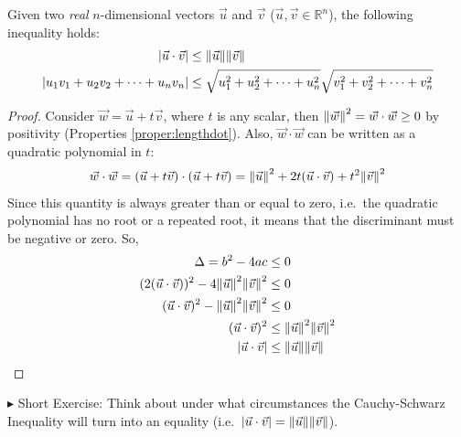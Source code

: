\begin{thm}
\label{thm:CauchySch}
Given two \textit{real} $n$-dimensional vectors $\vec{u}$ and $\vec{v}$ ($\vec{u}, \vec{v} \in \mathbb{R}^n$), the following inequality holds:
\begin{subequations}
\begin{align}
|\vec{u} \cdot \vec{v}| &\leq \norm{\vec{u}}\norm{\vec{v}} \\
|u_1v_1+u_2v_2+\cdots+u_nv_n| &\leq \sqrt{u_1^2+u_2^2+\cdots+u_n^2}\sqrt{v_1^2+v_2^2+\cdots+v_n^2}
\end{align}    
\end{subequations}
\end{thm}
\begin{proof}
Consider $\vec{w} = \vec{u} + t\vec{v}$, where $t$ is any scalar, then $\norm{\vec{w}}^2 = \vec{w}\cdot\vec{w} \geq 0$ by positivity (Properties \ref{proper:lengthdot}). Also, $\vec{w}\cdot\vec{w}$ can be written as a quadratic polynomial in $t$:
\begin{align*}
\vec{w}\cdot\vec{w} = (\vec{u} + t\vec{v}) \cdot (\vec{u} + t\vec{v}) = \norm{\vec{u}}^2 + 2t(\vec{u} \cdot \vec{v}) + t^2\norm{\vec{v}}^2
\end{align*}
Since this quantity is always greater than or equal to zero, i.e.\ the quadratic polynomial has no root or a repeated root, it means that the discriminant must be negative or zero. So,
\begin{align*}
\Delta = b^2 - 4ac &\leq 0 \\
(2(\vec{u} \cdot \vec{v}))^2 - 4\norm{\vec{u}}^2\norm{\vec{v}}^2 &\leq 0 \\
(\vec{u} \cdot \vec{v})^2 - \norm{\vec{u}}^2\norm{\vec{v}}^2 &\leq 0 \\
(\vec{u} \cdot \vec{v})^2 &\leq \norm{\vec{u}}^2\norm{\vec{v}}^2 \\
|\vec{u} \cdot \vec{v}| &\leq \norm{\vec{u}}\norm{\vec{v}}
\end{align*}
\end{proof}
$\blacktriangleright$ Short Exercise: Think about under what circumstances the Cauchy-Schwarz Inequality will turn into an equality (i.e.\ $\abs{\vec{u} \cdot \vec{v}} = \norm{\vec{u}}\norm{\vec{v}}$).\footnotemark

